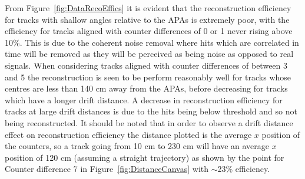 From Figure~\ref{fig:DataRecoEffics} it is evident that the reconstruction efficiency for tracks with shallow angles relative to the APAs is extremely poor, with the efficiency for tracks aligned with counter differences of 0 or 1 never rising above 10\%. This is due to the coherent noise removal where hits which are correlated in time will be removed as they will be perceived as being noise as opposed to real signals. When considering tracks aligned with counter differences of between 3 and 5 the reconstruction is seen to be perform reasonably well for tracks whose centres are less than 140 cm away from the APAs, before decreasing for tracks which have a longer drift distance. A decrease in reconstruction efficiency for tracks at large drift distances is due to the hits being below threshold and so not being reconstructed. It should be noted that in order to observe a drift distance effect on reconstruction efficiency the distance plotted is the average $x$ position of the counters, so a track going from 10 cm to 230 cm will have an average $x$ position of 120 cm (assuming a straight trajectory) as shown by the point for Counter difference 7 in Figure~\ref{fig:DistanceCanvas} with $\sim$23\% efficiency. \\


